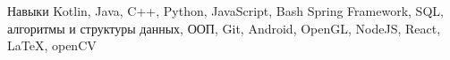 
\begin{rubric}{Навыки}
	Kotlin, Java, C++, Python, JavaScript, Bash
    Spring Framework, SQL, алгоритмы и структуры данных, ООП, Git, Android, OpenGL, NodeJS, React, LaTeX, openCV
\end{rubric}